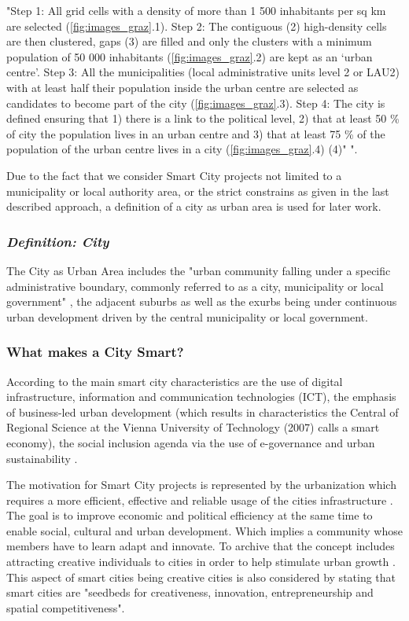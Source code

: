 "Step 1: All grid cells with a density of more than 1 500 inhabitants per sq km are selected (\ref{fig:images_graz}.1).
Step 2: The contiguous (2) high-density cells are then clustered, gaps (3) are filled and only the clusters with a minimum population
of 50 000 inhabitants (\ref{fig:images_graz}.2) are kept as an ‘urban centre’.
Step 3: All the municipalities (local administrative units level 2 or LAU2) with at least half their population inside the urban centre are selected as candidates to become part of the city (\ref{fig:images_graz}.3).
Step 4: The city is defined ensuring that 1) there is a link to the political level, 2) that at least 50 \% of city the population lives in an urban centre and 3) that at least 75 \% of the population of the urban centre lives in a city (\ref{fig:images_graz}.4) (4)" "\parencite{euDef}.

Due to the fact that we consider Smart City projects not limited to a municipality or local authority area, or the strict constrains as given in the last described approach, a definition of a city as urban area is used for later work.
 
\subsubsection{\textit{Definition: City}}
The City as Urban Area includes the "urban community falling under a specific administrative boundary, commonly referred to as a city, municipality or local government" \parencite{ISO37120}, the adjacent suburbs as well as the exurbs being under continuous urban development driven by the central municipality or local government.

\subsubsection{What makes a City Smart?}
According to \textcite{networkedCities} the main smart city characteristics are the use of digital infrastructure, information and communication technologies (ICT), the emphasis of business-led urban development (which results in characteristics the Central of Regional Science at the Vienna University of Technology (2007) calls a smart economy), the social inclusion agenda via the use of e-governance and urban sustainability  \parencite{networkedCities}. 

The motivation for Smart City projects is represented by the urbanization which requires a more efficient, effective and reliable usage of the cities infrastructure \parencite{berUrban}. The goal is to improve economic and political efficiency at the same time to enable social, cultural and urban development. Which implies a community whose members have to learn adapt and innovate. To archive that the concept includes attracting creative individuals to cities in order to help stimulate urban growth \parencite{networkedCities}. This aspect of smart cities being creative cities is also considered by \textcite{persSmart} stating that smart cities are "seedbeds for creativeness, innovation, entrepreneurship and spatial competitiveness". 


